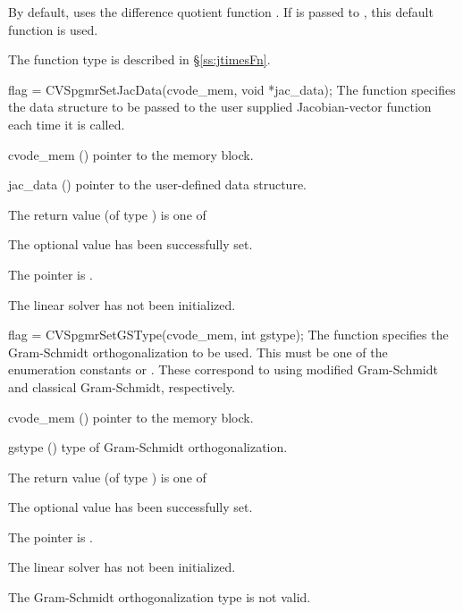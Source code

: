 {
  By default, {\cvspgmr} uses the difference quotient function .
  If  is passed to , this default function is used.

  The function type  is described in \S\ref{ss:jtimesFn}.
}
{
  flag = CVSpgmrSetJacData(cvode\_mem, void *jac\_data);
}
{
  The function  specifies the data structure
  to be passed to the user supplied Jacobian-vector
  function each time it is called.
}
{
  \begin{args}
  \item[cvode\_mem] ()
    pointer to the {\cvode} memory block.
  \item[jac\_data] ()
     pointer to the user-defined data structure.
  \end{args}
}
{
  The return value  (of type ) is one of
  \begin{args}
  \item[\Id{SUCCESS}] 
    The optional value has been successfully set.
  \item[\Id{LIN\_NO\_MEM}]
    The  pointer is .
  \item[\Id{LIN\_NO\_LMEM}]
    The {\cvspgmr} linear solver has not been initialized.
  \end{args}
}
{}
{
  flag = CVSpgmrSetGSType(cvode\_mem, int gstype);
}
{
  The function  specifies the 
  Gram-Schmidt orthogonalization to be used. 
  This must be one of the enumeration constants 
  or . These correspond to using modified Gram-Schmidt 
  and classical Gram-Schmidt, respectively. 
}
{
  \begin{args}
  \item[cvode\_mem] ()
    pointer to the {\cvode} memory block.
  \item[gstype] ()
    type of Gram-Schmidt orthogonalization.
  \end{args}
}
{
  The return value  (of type ) is one of
  \begin{args}
  \item[\Id{SUCCESS}] 
    The optional value has been successfully set.
  \item[\Id{LIN\_NO\_MEM}]
    The  pointer is .
  \item[\Id{LIN\_NO\_LMEM}]
    The {\cvspgmr} linear solver has not been initialized.
  \item[\Id{LIN\_ILL\_INPUT}]
    The Gram-Schmidt orthogonalization type  is not valid.
  \end{args}
}
